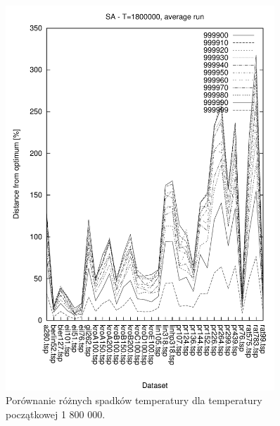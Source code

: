 \begin{figure}
\begin{center}
\includegraphics[width=0.9\textwidth]{wykresy/sa/sa_1800000_av}
\end{center}
\caption{Porównanie różnych spadków temperatury dla temperatury początkowej 1 800 000.}
\label{sa_1800000_av}
\end{figure}

